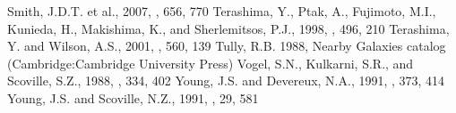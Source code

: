 \documentclass[manuscript]{aastex}
\begin{document}
\begin{thebibliography}{}
 Smith, J.D.T. et al., 2007, \apj, 656, 770
 Terashima, Y., Ptak, A., Fujimoto, M.I., Kunieda, H., Makishima, K., and Sherlemitsos, P.J., 1998, \apj, 496, 210
 Terashima, Y. and Wilson, A.S., 2001, \apj, 560, 139
 Tully, R.B. 1988, Nearby Galaxies catalog (Cambridge:Cambridge University Press)
 Vogel, S.N., Kulkarni, S.R., and Scoville, S.Z., 1988, \nat, 334, 402
 Young, J.S. and Devereux, N.A., 1991, \apj, 373, 414
 Young, J.S. and Scoville, N.Z., 1991, \araa, 29, 581
\end{thebibliography}

\clearpage
\end{document}
